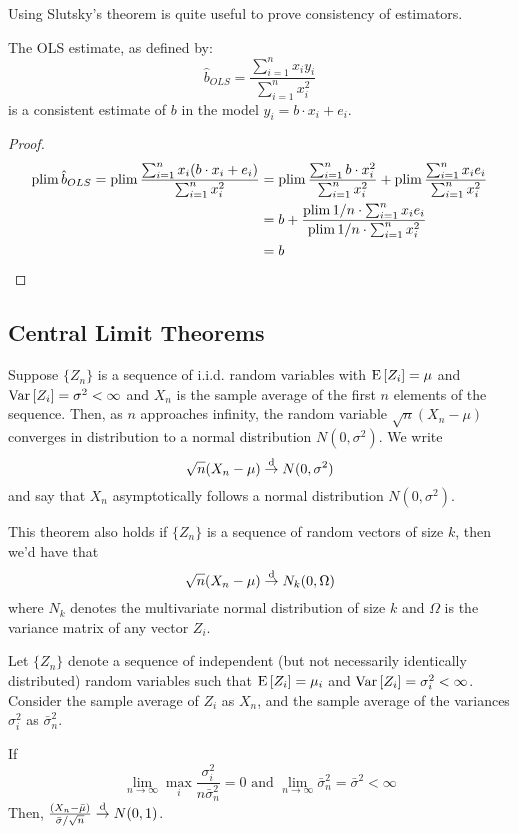 Using Slutsky's theorem is quite useful to prove consistency of estimators.

\begin{proposition}
The OLS estimate, as defined by: $$\hat b_{OLS} = \frac{\sum_{i=1}^{n} x_iy_i}{\sum_{i=1}^{n} x_i^2} $$ is a consistent estimate of $b$ in the model $y_i = b\cdot x_i + e_i$.
\end{proposition}

\begin{proof}
\begin{align*}
\operatorname{plim} \hat b_{OLS} = \operatorname{plim} \frac{\sum_{i=1}^{n} x_i(b\cdot x_i + e_i)}{\sum_{i=1}^{n} x_i^2} & = \operatorname{plim} \frac{\sum_{i=1}^{n} b\cdot x_i^2}{\sum_{i=1}^{n} x_i^2} + \operatorname{plim} \frac{\sum_{i=1}^{n}x_ie_i}{\sum_{i=1}^{n} x_i^2}\\
& = b + \frac{\operatorname{plim} 1/n\cdot \sum_{i=1}^{n}x_ie_i}{\operatorname{plim} 1/n\cdot \sum_{i=1}^{n} x_i^2}\\
& = b
\end{align*}
\end{proof}


\subsection{Central Limit Theorems}

\begin{theorem}

Suppose $\{Z_n\}$ is a sequence of i.i.d. random variables with $\operatorname{E}\left[Z_i\right] = \mu$ and $\operatorname{Var}\left[Z_i\right] = \sigma^2 <\infty$ and $X_n$ is the sample average of the first $n$ elements of the sequence. Then, as $n$ approaches infinity, the random variable $\sqrt{n}(X_n - \mu)$ converges in distribution to a normal distribution $N(0,\sigma^2)$. We write $$\sqrt{n}(X_n - \mu) \overset{\text{d}}{\to} N(0, \sigma^2) $$ and say that $X_n$ asymptotically follows a normal distribution $N(0, \sigma^2)$.

This theorem also holds if $\{Z_n\}$ is a sequence of random vectors of size $k$, then we'd have that $$\sqrt{n}(X_n - \mu) \overset{\text{d}}{\to} N_k(0, \Omega) $$ where $N_k$ denotes the multivariate normal distribution of size $k$ and $\Omega$ is the variance matrix of any vector $Z_i$.
\end{theorem}

\begin{theorem}
Let $\{Z_n\}$ denote a sequence of independent (but not necessarily identically distributed) random variables such that $\operatorname{E}\left[Z_i\right] = \mu_i$ and $\operatorname{Var}\left[Z_i\right] = \sigma_i^2 <\infty$. Consider the sample average of $Z_i$ as $X_n$, and the sample average of the variances $\sigma_i^2$ as $\bar\sigma_n^2$. 

If $$\lim_{n\to\infty} \max_{i} \frac{\sigma_i^2}{n\bar\sigma_n^2} = 0 \text{ and } \lim_{n\to\infty} \bar\sigma_n^2 = \bar\sigma^2 < \infty$$
Then, $\frac{(X_n - \bar\mu)}{\bar\sigma/\sqrt{n}} \overset{\text{d}}{\to} N(0, 1)$.
\end{theorem}

